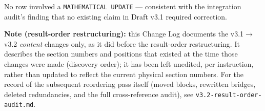 \documentclass[
]{article}
\begin{document}
No row involved a \texttt{MATHEMATICAL\ UPDATE} --- consistent with the
integration audit's finding that no existing claim in Draft v3.1
required correction.

\textbf{Note (result-order restructuring):} this Change Log documents
the v3.1\(\to\)v3.2 \emph{content} changes only, as it did before the
result-order restructuring. It describes the section numbers and
positions that existed at the time those changes were made (discovery
order); it has been left unedited, per instruction, rather than updated
to reflect the current physical section numbers. For the record of the
subsequent reordering pass itself (moved blocks, rewritten bridges,
deleted redundancies, and the full cross-reference audit), see
\texttt{v3.2-result-order-audit.md}.
\end{document}
